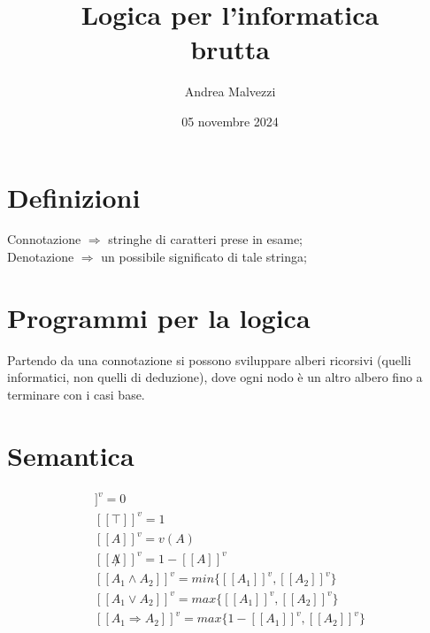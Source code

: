 \documentclass[12pt]{article}
\title{\textbf{Logica per l'informatica\\ brutta}}
\date{05 novembre 2024}
\author{Andrea Malvezzi}
\begin{document}
\maketitle
\pagebreak
\tableofcontents
\pagebreak
\section{Definizioni}
Connotazione $\Rightarrow$ stringhe di caratteri prese in esame;\\
Denotazione $\Rightarrow$ un possibile significato di tale stringa;
\section{Programmi per la logica}
Partendo da una connotazione si possono sviluppare alberi ricorsivi (quelli informatici, non quelli di deduzione), dove ogni nodo è un altro albero fino a terminare con i casi base.
\section{Semantica}
\begin{gather*}
    [[\bot]]^{v} = 0 \\
    [[\top]]^{v} = 1 \\
    [[A]]^{v} = v(A) \\
    [[\not A]]^{v} = 1 - [[A]]^{v} \\
    [[A_1 \wedge A_2]]^{v} = min\{[[A_1]]^{v}, [[A_2]]^{v}\} \\
    [[A_1 \vee A_2]]^{v} = max\{[[A_1]]^{v}, [[A_2]]^{v}\} \\
    [[A_1 \Rightarrow A_2]]^{v} = max\{1 - [[A_1]]^{v}, [[A_2]]^{v}\}
\end{gather*}
\end{document}
